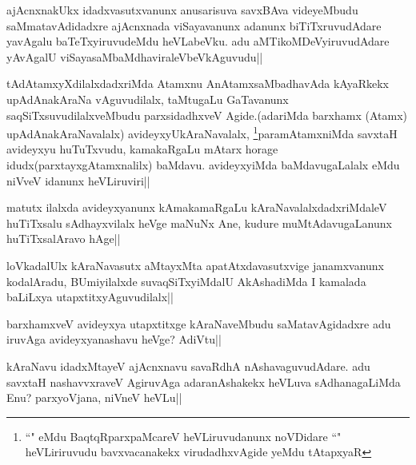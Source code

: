 \begin{artha}
ajAcnxnakUkx idadxvasutxvanunx anusarisuva savxBAva videyeMbudu saMmatavAdidadxre ajAcnxnada viSayavanunx adanunx biTiTxruvudAdare yavAgalu baTeTxyiruvudeMdu heVLabeVku. adu aMTikoMDeVyiruvudAdare yAvAgalU viSayasaMbaMdhaviraleVbeVkAguvudu||
\end{artha}


\begin{artha}
tAdAtamxyXdilalxdadxriMda Atamxnu AnAtamxsaMbadhavAda kAyaRkekx upAdAnakAraNa vAguvudilalx, taMtugaLu GaTavanunx saqSiTxsuvudilalxveMbudu parxsidadhxveV Agide.(adariMda barxhamx (Atamx) upAdAnakAraNavalalx) avideyxyUkAraNavalalx, \footnote{``\stext" eMdu BaqtqRparxpaMcareV heVLiruvudanunx noVDidare ``\stext" heVLiriruvudu bavxvacanakekx virudadhxvAgide yeMdu tAtapxyaR}paramAtamxniMda savxtaH avideyxyu huTuTxvudu, kamakaRgaLu mAtarx horage idudx(parxtayxgAtamxnalilx) baMdavu. avideyxyiMda baMdavugaLalalx eMdu niVveV idanunx heVLiruviri||
\end{artha}


\begin{artha}
matutx ilalxda avideyxyanunx kAmakamaRgaLu kAraNavalalxdadxriMdaleV huTiTxsalu 
sAdhayxvilalx heVge maNuNx Ane, kudure muMtAdavugaLanunx huTiTxsalAravo hAge||
\end{artha}

\begin{artha}
loVkadalUlx kAraNavasutx aMtayxMta apatAtxdavasutxvige janamxvanunx kodalAradu, BUmiyilalxde suvaqSiTxyiMdalU AkAshadiMda I kamalada baLiLxya utapxtitxyAguvudilalx||
\end{artha}

\begin{artha}
barxhamxveV avideyxya  utapxtitxge kAraNaveMbudu saMatavAgidadxre adu iruvAga avideyxyanashavu heVge? AdiVtu||
\end{artha}

\begin{artha}
kAraNavu idadxMtayeV ajAcnxnavu savaRdhA nAshavaguvudAdare. adu savxtaH nashavvxraveV AgiruvAga adaranAshakekx heVLuva sAdhanagaLiMda Enu? parxyoVjana, niVneV heVLu||
\end{artha}


